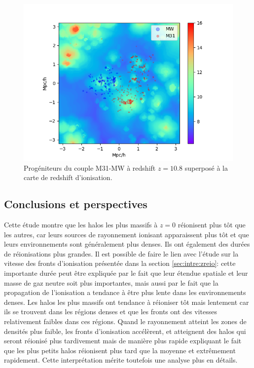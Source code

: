 \begin{figure}
		\centering
		\includegraphics[width=.95\linewidth]{img/05/map_LG.png}
        \caption[Réionisation du Groupe Local]{Progéniteurs du couple M31-MW à redshift $z=10.8$ superposé à la carte de redshift d'ionisation.
		\label{fig:CODA_LG}}
\end{figure}


\subsection{Conclusions et perspectives}


Cette étude montre que les halos les plus massifs à $z=0$ réionisent plus tôt que les autres, car leurs sources de rayonnement ionisant apparaissent plus tôt et que leurs environnements sont généralement plus denses.
Ils ont également des durées de réionisations plus grandes.
Il est possible de faire le lien avec l'étude sur la vitesse des fronts d'ionisation présentée dans la section \ref{sec:intre:zreio}:  cette importante durée peut être expliquée par le fait que leur étendue spatiale et leur masse de gaz neutre soit plus importantes, mais aussi par le fait que la propagation de l'ionisation a tendance à être plus lente dans les environnements denses.
Les halos les plus massifs ont tendance à réioniser tôt mais lentement car ils se trouvent dans les régions denses et que les fronts ont des vitesses relativement faibles dans ces régions. %
Quand le rayonnement atteint les zones de densités plus faible, les fronts d'ionisation accélèrent, et atteignent des halos qui seront réionisé plus tardivement mais de manière plus rapide expliquant le fait que les plus petits halos réionisent plus tard que la moyenne et extrêmement rapidement.
Cette interprétation mérite toutefois une analyse plus en détails.

